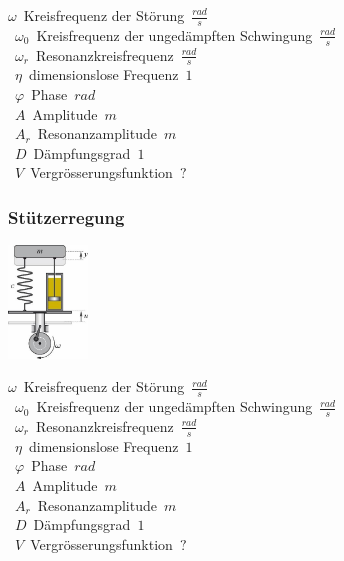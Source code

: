 \unit{$\omega$}{Kreisfrequenz der Störung}{$\frac{rad}{s}$} \\
\unit{$\omega_0$}{Kreisfrequenz der ungedämpften Schwingung}{$\frac{rad}{s}$} \\
\unit{$\omega_r$}{Resonanzkreisfrequenz}{$\frac{rad}{s}$} \\
\unit{$\eta$}{dimensionslose Frequenz}{$1$} \\
\unit{$\varphi$}{Phase}{$rad$} \\
\unit{$A$}{Amplitude}{$m$} \\
\unit{$A_r$}{Resonanzamplitude}{$m$} \\
\unit{$D$}{Dämpfungsgrad}{$1$} \\
\unit{$V$}{Vergrösserungsfunktion}{$?$} \\

\subsubsection{Stützerregung}
\begin{center}
	\begin{minipage}{0.4\textwidth}
	\end{minipage}%
	\begin{minipage}{0.1\textwidth}
	\includegraphics[height=3cm,center,keepaspectratio=true]{Images/stuezerregung.png}
	\end{minipage}
\end{center}

\unit{$\omega$}{Kreisfrequenz der Störung}{$\frac{rad}{s}$} \\
\unit{$\omega_0$}{Kreisfrequenz der ungedämpften Schwingung}{$\frac{rad}{s}$} \\
\unit{$\omega_r$}{Resonanzkreisfrequenz}{$\frac{rad}{s}$} \\
\unit{$\eta$}{dimensionslose Frequenz}{$1$} \\
\unit{$\varphi$}{Phase}{$rad$} \\
\unit{$A$}{Amplitude}{$m$} \\
\unit{$A_r$}{Resonanzamplitude}{$m$} \\
\unit{$D$}{Dämpfungsgrad}{$1$} \\
\unit{$V$}{Vergrösserungsfunktion}{$?$} \\

